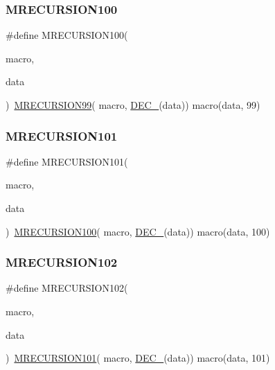 \subsubsection{\texorpdfstring{MRECURSION100}{MRECURSION100}}
{\footnotesize\ttfamily \#define M\+R\+E\+C\+U\+R\+S\+I\+O\+N100(\begin{DoxyParamCaption}\item[{}]{macro,  }\item[{}]{data }\end{DoxyParamCaption})~\mbox{\hyperlink{group__group__sam0__utils__mrecursion_ga49ea729b9d1196d0bb2b9d35834bdcd8}{M\+R\+E\+C\+U\+R\+S\+I\+O\+N99}}(  macro, \mbox{\hyperlink{group__group__sam0__utils__mrecursion_ga1d23d683797679dca8c3512a54a5dcae}{D\+E\+C\+\_\+}}(data))   macro(data, 99)}

\mbox{\label{group__group__sam0__utils__mrecursion_gae895878fcdbb1862624dd17835337f7e}} 
\subsubsection{\texorpdfstring{MRECURSION101}{MRECURSION101}}
{\footnotesize\ttfamily \#define M\+R\+E\+C\+U\+R\+S\+I\+O\+N101(\begin{DoxyParamCaption}\item[{}]{macro,  }\item[{}]{data }\end{DoxyParamCaption})~\mbox{\hyperlink{group__group__sam0__utils__mrecursion_ga858f2b3d9b3437edb4fc4fd519c4fee7}{M\+R\+E\+C\+U\+R\+S\+I\+O\+N100}}(  macro, \mbox{\hyperlink{group__group__sam0__utils__mrecursion_ga1d23d683797679dca8c3512a54a5dcae}{D\+E\+C\+\_\+}}(data))   macro(data, 100)}

\mbox{\label{group__group__sam0__utils__mrecursion_gae7ed0e33ac140200e71c2a57234c08aa}} 
\subsubsection{\texorpdfstring{MRECURSION102}{MRECURSION102}}
{\footnotesize\ttfamily \#define M\+R\+E\+C\+U\+R\+S\+I\+O\+N102(\begin{DoxyParamCaption}\item[{}]{macro,  }\item[{}]{data }\end{DoxyParamCaption})~\mbox{\hyperlink{group__group__sam0__utils__mrecursion_gae895878fcdbb1862624dd17835337f7e}{M\+R\+E\+C\+U\+R\+S\+I\+O\+N101}}(  macro, \mbox{\hyperlink{group__group__sam0__utils__mrecursion_ga1d23d683797679dca8c3512a54a5dcae}{D\+E\+C\+\_\+}}(data))   macro(data, 101)}

